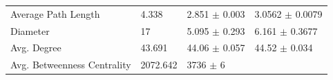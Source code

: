 \documentclass[12pt,twoside]{amherstthesis}
\begin{document}
\begin{longtable}[]{@{}llll@{}}
\begin{minipage}[t]{0.28\columnwidth}
  Average Path Length\strut
  \end{minipage} & \begin{minipage}[t]{0.11\columnwidth}\raggedright\strut
  4.338\strut
  \end{minipage} & \begin{minipage}[t]{0.24\columnwidth}\raggedright\strut
  2.851 \(\pm\) 0.003\strut
  \end{minipage} & \begin{minipage}[t]{0.26\columnwidth}\raggedright\strut
  3.0562 \(\pm\) 0.0079\strut
  \end{minipage}\tabularnewline
  \begin{minipage}[t]{0.28\columnwidth}\raggedright\strut
  Diameter\strut
  \end{minipage} & \begin{minipage}[t]{0.11\columnwidth}\raggedright\strut
  17\strut
  \end{minipage} & \begin{minipage}[t]{0.24\columnwidth}\raggedright\strut
  5.095 \(\pm\) 0.293\strut
  \end{minipage} & \begin{minipage}[t]{0.26\columnwidth}\raggedright\strut
  6.161 \(\pm\) 0.3677\strut
  \end{minipage}\tabularnewline
  \begin{minipage}[t]{0.28\columnwidth}\raggedright\strut
  Avg. Degree\strut
  \end{minipage} & \begin{minipage}[t]{0.11\columnwidth}\raggedright\strut
  43.691\strut
  \end{minipage} & \begin{minipage}[t]{0.24\columnwidth}\raggedright\strut
  44.06 \(\pm\) 0.057\strut
  \end{minipage} & \begin{minipage}[t]{0.26\columnwidth}\raggedright\strut
  44.52 \(\pm\) 0.034\strut
  \end{minipage}\tabularnewline
  \begin{minipage}[t]{0.28\columnwidth}\raggedright\strut
  Avg. Betweenness Centrality\strut
  \end{minipage} & \begin{minipage}[t]{0.11\columnwidth}\raggedright\strut
  2072.642\strut
  \end{minipage} & \begin{minipage}[t]{0.24\columnwidth}\raggedright\strut
  3736 \(\pm\) 6\strut
  \end{minipage} & \begin{minipage}[t]{0.26\columnwidth}\raggedright\strut

\end{minipage}
\end{longtable}
\end{document}
